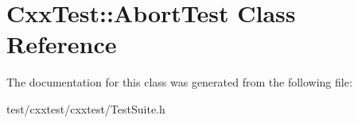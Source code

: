 \hypertarget{classCxxTest_1_1AbortTest}{\section{Cxx\-Test\-:\-:Abort\-Test Class Reference}
\label{classCxxTest_1_1AbortTest}
}


The documentation for this class was generated from the following file\-:\begin{DoxyCompactItemize}
\item 
test/cxxtest/cxxtest/Test\-Suite.\-h\end{DoxyCompactItemize}
